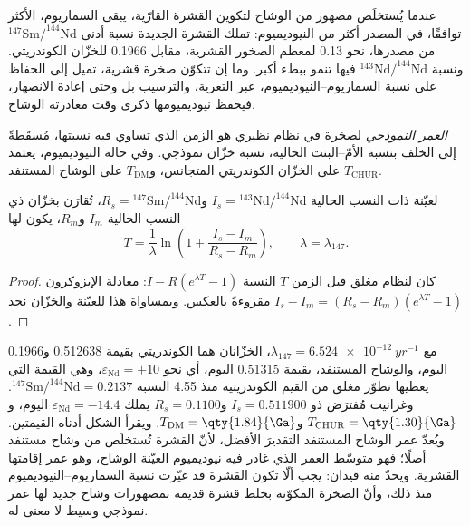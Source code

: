 عندما يُستخلَص مصهور من الوشاح لتكوين القشرة القارّية، يبقى السماريوم،
الأكثر توافقًا، في المصدر أكثر من النيوديميوم: تملك القشرة الجديدة نسبة أدنى
$^{147}\mathrm{Sm}/^{144}\mathrm{Nd}$ من مصدرها، نحو 0.13 لمعظم
الصخور القشرية، مقابل 0.1966 للخزّان الكوندريتي. ونسبة
$^{143}\mathrm{Nd}/^{144}\mathrm{Nd}$ فيها تنمو ببطء أكبر. وما إن تتكوّن صخرة قشرية، تميل
إلى الحفاظ على نسبة السماريوم--النيوديميوم، عبر التعرية،
والترسيب بل وحتى إعادة الانصهار، فيحفظ نيوديميومها ذكرى وقت مغادرته
الوشاح.

\begin{definition}\label{def:b3:advanced-geochronology:model-age}
\emph{العمر النموذجي} لصخرة في نظام نظيري هو الزمن
الذي تساوي فيه نسبتها، مُسقَطةً إلى الخلف بنسبة الأمّ--البنت الحالية،
نسبة خزّان نموذجي. وفي حالة النيوديميوم، يعتمد $T_{\mathrm{CHUR}}$
على الخزّان الكوندريتي المتجانس، و$T_{\mathrm{DM}}$ على الوشاح
المستنفد.
\end{definition}

\begin{theorem}\label{thm:b3:advanced-geochronology:model-age}
لعيّنة ذات النسب الحالية $I_s = {}^{143}\mathrm{Nd}/^{144}\mathrm{Nd}$
و$R_s = {}^{147}\mathrm{Sm}/^{144}\mathrm{Nd}$، تُقارَن بخزّان ذي النسب الحالية
$I_m$ و$R_m$، يكون لها 
\[
T = \frac1\lambda\ln\left(1 + \frac{I_s - I_m}{R_s - R_m}\right),
\qquad \lambda = \lambda_{147}.
\]
\end{theorem}

\begin{proof}
كان لنظام مغلق قبل الزمن $T$ النسبة $I - R(e^{\lambda T} - 1)$: معادلة
الإيزوكرون مقروءةً بالعكس. وبمساواة هذا للعيّنة
والخزّان نجد $I_s - I_m = (R_s - R_m)(e^{\lambda T} - 1)$.
\end{proof}

مع $\lambda_{147} = \qty{6.524e-12}{yr^{-1}}$، الخزّانان هما
الكوندريتي بقيمة 0.512638 و0.1966 اليوم، والوشاح المستنفد،
بقيمة 0.51315 اليوم، أي نحو $\varepsilon_{\mathrm{Nd}} = +10$، وهي القيمة التي يعطيها تطوّر مغلق
من القيم الكوندريتية منذ \qty{4.55}{\Ga} النسبة
$^{147}\mathrm{Sm}/^{144}\mathrm{Nd} = 0.2137$. وغرانيت مُفترَض ذو
$I_s = 0.511900$ و$R_s = 0.1100$ يملك $\varepsilon_{\mathrm{Nd}} = -14.4$
اليوم، و$T_{\mathrm{CHUR}} = \qty{1.30}{\Ga}$ و$T_{\mathrm{DM}} =
\qty{1.84}{\Ga}$. ويقرأ الشكل أدناه القيمتين. ويُعدّ عمر الوشاح المستنفد
التقديرَ الأفضل، لأنّ القشرة تُستخلَص من وشاح مستنفد أصلًا؛
 فهو متوسّط العمر الذي غادر فيه نيوديميوم العيّنة الوشاح،
وهو عمر إقامتها القشرية. ويحدّ منه قيدان: يجب ألّا تكون القشرة قد غيّرت
نسبة السماريوم--النيوديميوم منذ ذلك، وأنّ الصخرة المكوّنة بخلط
قشرة قديمة بمصهورات وشاح جديد لها عمر نموذجي وسيط لا معنى له.


